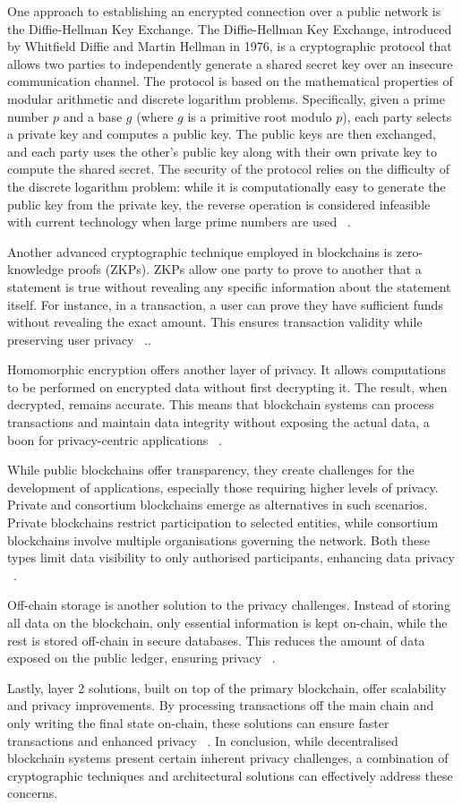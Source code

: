One approach to establishing  an encrypted connection over a public network is the Diffie-Hellman Key Exchange. The Diffie-Hellman Key Exchange, introduced by Whitfield Diffie and Martin Hellman in 1976, is a cryptographic protocol that allows two parties to independently generate a shared secret key over an insecure communication channel. The protocol is based on the mathematical properties of modular arithmetic and discrete logarithm problems. Specifically, given a prime number \( p \) and a base \( g \) (where \( g \) is a primitive root modulo \( p \)), each party selects a private key and computes a public key. The public keys are then exchanged, and each party uses the other's public key along with their own private key to compute the shared secret. The security of the protocol relies on the difficulty of the discrete logarithm problem: while it is computationally easy to generate the public key from the private key, the reverse operation is considered infeasible with current technology when large prime numbers are used ~\cite{1055638}.

Another advanced cryptographic technique employed in blockchains is zero-knowledge proofs (ZKPs). ZKPs allow one party to prove to another that a statement is true without revealing any specific information about the statement itself. For instance, in a transaction, a user can prove they have sufficient funds without revealing the exact amount. This ensures transaction validity while preserving user privacy ~\cite{Tran.2022b}..

Homomorphic encryption offers another layer of privacy. It allows computations to be performed on encrypted data without first decrypting it. The result, when decrypted, remains accurate. This means that blockchain systems can process transactions and maintain data integrity without exposing the actual data, a boon for privacy-centric applications ~\cite{Putra.}.

While public blockchains offer transparency, they create challenges for the development of applications, especially those requiring higher levels of privacy. Private and consortium blockchains emerge as alternatives in such scenarios. Private blockchains restrict participation to selected entities, while consortium blockchains involve multiple organisations governing the network. Both these types limit data visibility to only authorised participants, enhancing data privacy ~\cite{9334132}.

Off-chain storage is another solution to the privacy challenges. Instead of storing all data on the blockchain, only essential information is kept on-chain, while the rest is stored off-chain in secure databases. This reduces the amount of data exposed on the public ledger, ensuring privacy ~\cite{9838289}.

Lastly, layer 2 solutions, built on top of the primary blockchain, offer scalability and privacy improvements. By processing transactions off the main chain and only writing the final state on-chain, these solutions can ensure faster transactions and enhanced privacy ~\cite{10039486}. In conclusion, while decentralised blockchain systems present certain inherent privacy challenges, a combination of cryptographic techniques and architectural solutions can effectively address these concerns.